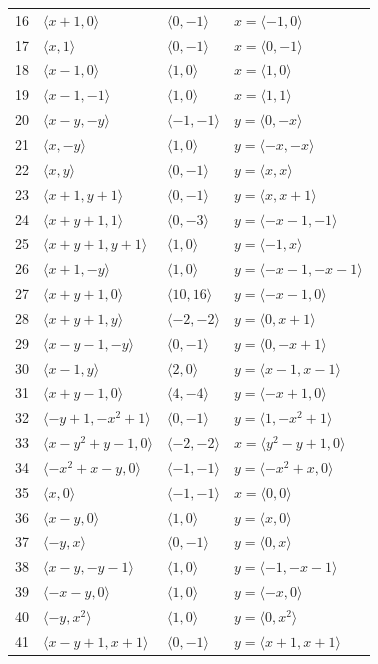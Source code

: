 \documentclass[11pt]{article}
\begin{document}
\begin{longtable}{@{}rlll@{}}
16 & $\langle x+1,0\rangle$ & $\langle 0,-1\rangle$ & $x=\langle -1,0\rangle$\\
17 & $\langle x,1\rangle$ & $\langle 0,-1\rangle$ & $x=\langle 0,-1\rangle$\\
18 & $\langle x-1,0\rangle$ & $\langle 1,0\rangle$ & $x=\langle 1,0\rangle$\\
19 & $\langle x-1,-1\rangle$ & $\langle 1,0\rangle$ & $x=\langle 1,1\rangle$\\
20 & $\langle x-y,-y\rangle$ & $\langle -1,-1\rangle$ & $y=\langle 0,-x\rangle$\\
21 & $\langle x,-y\rangle$ & $\langle 1,0\rangle$ & $y=\langle -x,-x\rangle$\\
22 & $\langle x,y\rangle$ & $\langle 0,-1\rangle$ & $y=\langle x,x\rangle$\\
23 & $\langle x+1,y+1\rangle$ & $\langle 0,-1\rangle$ & $y=\langle x,x+1\rangle$\\
24 & $\langle x+y+1,1\rangle$ & $\langle 0,-3\rangle$ & $y=\langle -x-1,-1\rangle$\\
25 & $\langle x+y+1,y+1\rangle$ & $\langle 1,0\rangle$ & $y=\langle -1,x\rangle$\\
26 & $\langle x+1,-y\rangle$ & $\langle 1,0\rangle$ & $y=\langle -x-1,-x-1\rangle$\\
27 & $\langle x+y+1,0\rangle$ & $\langle 10,16\rangle$ & $y=\langle -x-1,0\rangle$\\
28 & $\langle x+y+1,y\rangle$ & $\langle -2,-2\rangle$ & $y=\langle 0,x+1\rangle$\\
29 & $\langle x-y-1,-y\rangle$ & $\langle 0,-1\rangle$ & $y=\langle 0,-x+1\rangle$\\
30 & $\langle x-1,y\rangle$ & $\langle 2,0\rangle$ & $y=\langle x-1,x-1\rangle$\\
31 & $\langle x+y-1,0\rangle$ & $\langle 4,-4\rangle$ & $y=\langle -x+1,0\rangle$\\
32 & $\langle -y+1,-x^{2}+1\rangle$ & $\langle 0,-1\rangle$ & $y=\langle 1,-x^{2}+1\rangle$\\
33 & $\langle x-y^{2}+y-1,0\rangle$ & $\langle -2,-2\rangle$ & $x=\langle y^{2}-y+1,0\rangle$\\
34 & $\langle -x^{2}+x-y,0\rangle$ & $\langle -1,-1\rangle$ & $y=\langle -x^{2}+x,0\rangle$\\
35 & $\langle x,0\rangle$ & $\langle -1,-1\rangle$ & $x=\langle 0,0\rangle$\\
36 & $\langle x-y,0\rangle$ & $\langle 1,0\rangle$ & $y=\langle x,0\rangle$\\
37 & $\langle -y,x\rangle$ & $\langle 0,-1\rangle$ & $y=\langle 0,x\rangle$\\
38 & $\langle x-y,-y-1\rangle$ & $\langle 1,0\rangle$ & $y=\langle -1,-x-1\rangle$\\
39 & $\langle -x-y,0\rangle$ & $\langle 1,0\rangle$ & $y=\langle -x,0\rangle$\\
40 & $\langle -y,x^{2}\rangle$ & $\langle 1,0\rangle$ & $y=\langle 0,x^{2}\rangle$\\
41 & $\langle x-y+1,x+1\rangle$ & $\langle 0,-1\rangle$ & $y=\langle x+1,x+1\rangle$\\
\end{longtable}
\endgroup
\end{document}
